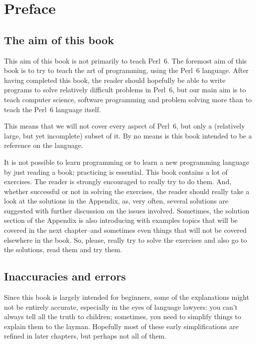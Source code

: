
\chapter{Preface}

\section*{The aim of this book}

This aim of this book is not primarily to teach Perl~6. 
The foremost aim of this book is to try to teach the art 
of programming, using the Perl~6 language. After having 
completed this book, the reader should hopefully be able 
to write programs to solve relatively difficult problems in 
Perl~6, but our main aim is to teach computer science, software 
programming and problem solving more than to teach the Perl~6 
language itself. 

This means that we will not cover every aspect of Perl~6, but 
only a (relatively large, but yet incomplete) subset of it. 
By no means is this book intended to be a reference on the 
language.

It is not possible to learn programming or to learn a new 
programming language by just reading a book; practicing 
is essential. This book contains a lot of exercises. The 
reader is strongly encouraged to really try to do them. And, 
whether successful or not in solving the exercises, the reader 
should really take a look at the solutions in the Appendix, 
as, very often, several solutions are suggested with further 
discussion on the issues involved. Sometimes, the solution 
section of the Appendix is also introducing with examples topics 
that will be covered in the next chapter--and sometimes even 
things that will not be covered elsewhere in the book. So, 
please, really try to solve the exercises and also go to 
the solutions, read them and try them.

\section*{Inaccuracies and errors}

Since this book is largely intended for beginners, some of 
the explanations might not be entirely accurate, especially 
in the eyes of language lawyers: you can't always tell all 
the truth to children; sometimes, you need to simplify things 
to explain them to the layman. Hopefully most of these early 
simplifications are refined in later chapters, but perhaps 
not all of them.


